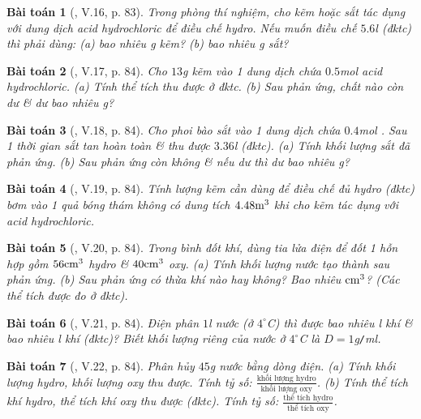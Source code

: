 \documentclass{article}
\newtheorem{baitoan}{Bài toán}
\begin{document}
\begin{baitoan}[\cite{Truong_BTNC_Hoa_Hoc_8_2022}, V.16, p. 83]
	Trong phòng thí nghiệm, cho kẽm hoặc sắt tác dụng với dung dịch acid hydrochloric để điều chế hydro. Nếu muốn điều chế $5.6$\emph{l } (đktc) thì phải dùng: (a) bao nhiêu \emph{g} kẽm? (b) bao nhiêu \emph{g} sắt?
\end{baitoan}

\begin{baitoan}[\cite{Truong_BTNC_Hoa_Hoc_8_2022}, V.17, p. 84]
	Cho $13$\emph{g} kẽm vào 1 dung dịch chứa $0.5$\emph{mol} acid hydrochloric. (a) Tính thể tích \emph{} thu được ở đktc. (b) Sau phản ứng, chất nào còn dư \& dư bao nhiêu \emph{g}?
\end{baitoan}

\begin{baitoan}[\cite{Truong_BTNC_Hoa_Hoc_8_2022}, V.18, p. 84]
	Cho phoi bào sắt vào 1 dung dịch chứa $0.4$\emph{mol }. Sau 1 thời gian sắt tan hoàn toàn \& thu được $3.36$\emph{l } (đktc). (a) Tính khối lượng sắt đã phản ứng. (b) Sau phản ứng còn \emph{} không \& nếu dư thì dư bao nhiêu \emph{g}?
\end{baitoan}

\begin{baitoan}[\cite{Truong_BTNC_Hoa_Hoc_8_2022}, V.19, p. 84]
	Tính lượng kẽm cần dùng để điều chế đủ hydro (đktc) bơm vào 1 quả bóng thám không có dung tích $\rm4.48m^3$ khi cho kẽm tác dụng với acid hydrochloric.
\end{baitoan}

\begin{baitoan}[\cite{Truong_BTNC_Hoa_Hoc_8_2022}, V.20, p. 84]
	Trong bình đốt khí, dùng tia lửa điện để đốt 1 hỗn hợp gồm $\rm56cm^3$ hydro \& $\rm40cm^3$ oxy. (a) Tính khối lượng nước tạo thành sau phản ứng. (b) Sau phản ứng có thừa khí nào hay không? Bao nhiêu $\rm cm^3$? (Các thể tích được đo ở đktc).
\end{baitoan}

\begin{baitoan}[\cite{Truong_BTNC_Hoa_Hoc_8_2022}, V.21, p. 84]
	Điện phân $1$\emph{l} nước (ở $4^\circ$C) thì được bao nhiêu \emph{l} khí \emph{} \& bao nhiêu \emph{l} khí \emph{} (đktc)? Biết khối lượng riêng của nước ở $4^\circ$C là $D = 1$\emph{g\texttt{/}ml}.
\end{baitoan}

\begin{baitoan}[\cite{Truong_BTNC_Hoa_Hoc_8_2022}, V.22, p. 84]
	Phân hủy $45$\emph{g} nước bằng dòng điện. (a) Tính khối lượng hydro, khối lượng oxy thu được. Tính tỷ số: $\frac{\mbox{khối lượng hydro}}{\mbox{khối lượng oxy}}$. (b) Tính thể tích khí hydro, thể tích khí oxy thu được (đktc). Tính tỷ số: $\frac{\mbox{thể tích hydro}}{\mbox{thể tích oxy}}$.
\end{baitoan}
\end{document}
